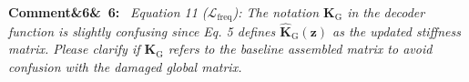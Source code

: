 \documentclass[11pt]{article}
\newenvironment{rcomment}[1]{\par\bigskip\noindent\textbf{Comment\ifx&#1&\else\ #1\fi:}\ \itshape}{\par}
\newenvironment{action}{\par\smallskip\noindent\color{resp}\textbf{Action:}\ }{\par}
\newcommand{\tbd}[1]{\textcolor{note}{\textsf{[#1]}}}
\newcommand{\lines}[1]{\tbd{lines #1}}
\newcommand{\m}{\mathbf{m}}
\newcommand{\z}{\mathbf{z}}
\begin{document}



\begin{rcomment}{6}
Equation 11 ($\mathcal{L}_{\mathrm{freq}}$): The notation $\mathbf{K}_{\mathrm{G}}$ in the decoder function is slightly
confusing since Eq. 5 defines $\hat{\mathbf{K}}_{\mathrm{G}}(\z)$ as the updated stiffness matrix. Please clarify if
$\mathbf{K}_{\mathrm{G}}$ refers to the baseline assembled matrix to avoid confusion with the damaged global matrix.
\end{rcomment}
\end{document}

